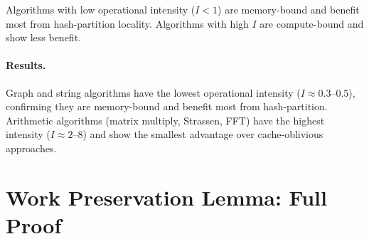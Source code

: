 \documentclass[11pt]{article}
\begin{document}
Algorithms with low operational intensity ($I < 1$) are memory-bound and
benefit most from hash-partition locality.  Algorithms with high $I$
are compute-bound and show less benefit.

\paragraph{Results.}
Graph and string algorithms have the lowest operational intensity
($I \approx 0.3$--$0.5$), confirming they are memory-bound and benefit
most from hash-partition.  Arithmetic algorithms (matrix multiply,
Strassen, FFT) have the highest intensity ($I \approx 2$--$8$) and
show the smallest advantage over cache-oblivious approaches.

\section{Work Preservation Lemma: Full Proof}
\label{app:work}
\end{document}
